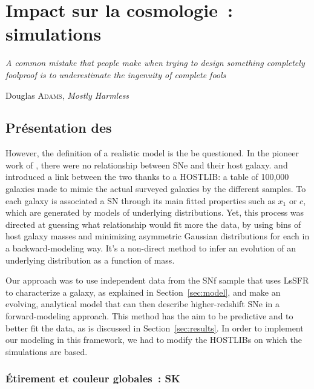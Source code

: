 \documentclass[../main/main.tex]{subfiles}
\begin{document}
\dominitoc
\faketableofcontents
\dominilof
\fakelistoffigures
\dominilot
\fakelistoftables

\chapter{Impact sur la cosmologie~: simulations}\label{ch:sims}
\epigraph{\openquote\textit{A common mistake that people make when trying to
design something completely foolproof is to underestimate the ingenuity of
complete fools}\closequote}{Douglas \textsc{Adams}, \textit{Mostly Harmless}}

\vfill
\minitoc
\vfill

\newpage

\section{Présentation des \hostlib}\label{sec:hpres}

However, the definition of a realistic model is the be questioned. In the
pioneer work of \cite{scolnic2016}, there were no relationship between SNe and
their host galaxy. \cite{popovic2021a} and~\cite{smith2020} introduced a link
between the two thanks to a HOSTLIB: a table of 100,000 galaxies made to mimic
the actual surveyed galaxies by the different samples. To each galaxy is
associated a SN through its main fitted properties such as $x_1$ or $c$, which
are generated by models of underlying distributions. Yet, this process was
directed at guessing what relationship would fit more the data, by using bins of
host galaxy masses and minimizing asymmetric Gaussian distributions for each in
a backward-modeling way. It's a non-direct method to infer an evolution of an
underlying distribution as a function of mass.

Our approach was to use independent data from the SNf sample that uses LsSFR to
characterize a galaxy, as explained in Section~\ref{sec:model}, and make an
evolving, analytical model that can then describe higher-redshift SNe in a
forward-modeling approach. This method has the aim to be predictive and to
better fit the data, as is discussed in Section~\ref{sec:results}. In order to
implement our modeling in this framework, we had to modify the HOSTLIBs on which
the simulations are based.
\subsection{Étirement et couleur globales~: SK}\label{ssec:sk}
\end{document}
